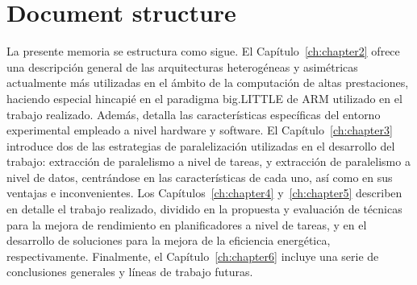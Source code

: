 \section{Document structure}
La presente memoria se estructura como sigue. 
El Capítulo~\ref{ch:chapter2} ofrece una descripción general de las
arquitecturas heterogéneas y asimétricas actualmente más utilizadas en el
ámbito de la computación de altas prestaciones, haciendo especial hincapié
en el paradigma big.LITTLE de ARM utilizado en el trabajo
realizado. Además, detalla las características específicas del entorno
experimental empleado a nivel hardware y software.
El Capítulo~\ref{ch:chapter3} introduce dos de las estrategias de
paralelización utilizadas en el desarrollo del trabajo: extracción de
paralelismo a nivel de tareas, y extracción de paralelismo a nivel de
datos, centrándose en las características de cada uno, así como en sus
ventajas e inconvenientes.
Los Capítulos~\ref{ch:chapter4} y~\ref{ch:chapter5} describen en detalle el
trabajo realizado, dividido en la propuesta y evaluación de técnicas para
la mejora de rendimiento en planificadores a nivel de tareas, y en el
desarrollo de soluciones para la mejora de la eficiencia energética,
respectivamente.
Finalmente, el Capítulo~\ref{ch:chapter6} incluye una serie de conclusiones
generales y líneas de trabajo futuras.


